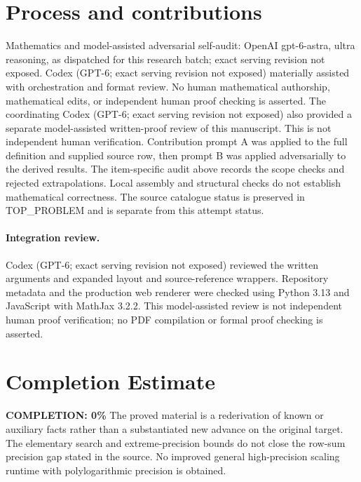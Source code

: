 \documentclass[11pt]{article}
\begin{document}
\section{Process and contributions}
Mathematics and model-assisted adversarial self-audit: OpenAI gpt-6-astra, ultra reasoning, as dispatched for this research batch; exact serving revision not exposed. Codex (GPT-6; exact serving revision not exposed) materially assisted with orchestration and format review. No human mathematical authorship, mathematical edits, or independent human proof checking is asserted.
The coordinating Codex (GPT-6; exact serving revision not exposed) also provided a separate model-assisted written-proof review of this manuscript. This is not independent human verification.
Contribution prompt A was applied to the full definition and supplied source row, then prompt B was applied adversarially to the derived results. The item-specific audit above records the scope checks and rejected extrapolations. Local assembly and structural checks do not establish mathematical correctness. The source catalogue status is preserved in TOP\_PROBLEM and is separate from this attempt status.
\paragraph{Integration review.} Codex (GPT-6; exact serving revision not exposed) reviewed the written arguments and expanded layout and source-reference wrappers. Repository metadata and the production web renderer were checked using Python 3.13 and JavaScript with MathJax 3.2.2. This model-assisted review is not independent human proof verification; no PDF compilation or formal proof checking is asserted.

\section{Completion Estimate}
\noindent\textbf{COMPLETION: 0\%}
The proved material is a rederivation of known or auxiliary facts rather than a substantiated new advance on the original target. The elementary search and extreme-precision bounds do not close the row-sum precision gap stated in the source. No improved general high-precision scaling runtime with polylogarithmic precision is obtained.
\end{document}
